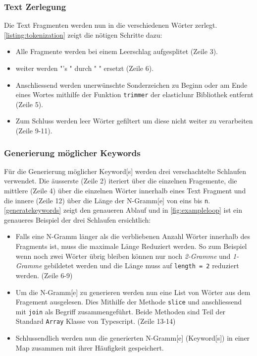 \subsubsection{Text Zerlegung}
Die Text Fragmenten werden nun in die verschiedenen Wörter zerlegt. \autoref{listing:tokenization} zeigt die nötigen Schritte dazu:
\begin{itemize}
    \item Alle Fragmente werden bei einem Leerschlag aufgesplitet (Zeile 3).
    \item weiter werden "'s " durch " " ersetzt (Zeile 6).
    \item Anschliessend werden unerwünschte Sonderzeichen zu Beginn oder am Ende eines Wortes mithilfe der Funktion \texttt{trimmer} der \gls{elasticlunr} Bibliothek entfernt (Zeile 5).
    \item Zum Schluss werden leer Wörter gefiltert um diese nicht weiter zu verarbeiten (Zeile 9-11). 
\end{itemize}



\subsubsection{Generierung möglicher Keywords}
Für die Generierung möglicher \gls{Keyword}[s] werden drei verschachtelte Schlaufen verwendet. Die äusserste (Zeile 2) iteriert über die einzelnen Fragemente, die mittlere (Zeile 4) über die einzelnen Wörter innerhalb eines Text Fragment und die innere (Zeile 12) über die Länge der \gls{N-Gramm}[e] von eins bis \texttt{n}.
\autoref{generatekeywords} zeigt den genaueren Ablauf und in \autoref{fig:exampleloop} ist ein genaueres Beispiel der drei Schlaufen ersichtlich:
\begin{itemize}
     \item Falls eine \gls{N-Gramm} länger als die verbliebenen Anzahl Wörter innerhalb des Fragments ist, muss die maximale Länge Reduziert werden. So zum Beispiel wenn noch zwei Wörter übrig bleiben können nur noch \textit{2-Gramme} und \textit{1-Gramme} gebildetet werden und die Länge muss auf \texttt{length = 2} reduziert werden. (Zeile 6-9)
     \item Um die \gls{N-Gramm}[e] zu generieren werden nun eine List von Wörter aus dem Fragement ausgelesen. Dies Mithilfe der Methode \texttt{slice} und anschliessend mit \texttt{join} als Begriff zusammengeführt. Beide Methoden sind Teil der Standard \texttt{Array} Klasse von Typescript. (Zeile 13-14)
     \item Schlussendlich werden nun die generierten \gls{N-Gramm}[e] (\gls{Keyword}[s]) in einer Map zusammen mit ihrer Häufigkeit gespeichert.
\end{itemize}

